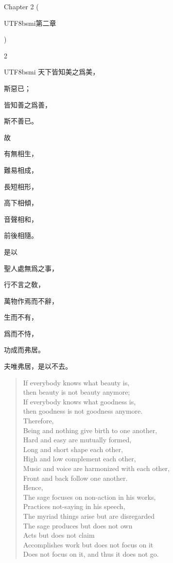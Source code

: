 Chapter 2 (\begin{CJK*}{UTF8}{bsmi}第二章\end{CJK*})
\begin{paracol}{2}
\begin{CJK*}{UTF8}{bsmi}
天下皆知美之爲美，

斯惡已；

皆知善之爲善，

斯不善已。

故

有無相生，

難易相成，

長短相形，

高下相傾，

音聲相和，

前後相隨。

是以

聖人處無爲之事，

行不言之敎，

萬物作焉而不辭，

生而不有，

爲而不恃，

功成而弗居。

夫唯弗居，是以不去。
\end{CJK*}
\switchcolumn
\vspace*{-2ex}
\begin{verse}
If everybody knows what beauty is,\\
then beauty is not beauty anymore;\\
If everybody knows what goodness is,\\
then goodness is not goodness anymore.\\
Therefore,\\
Being and nothing give birth to one another,\\
Hard and easy are mutually formed,\\
Long and short shape each other,\\
High and low complement each other,\\
Music and voice are harmonized with each other,\\
Front and back follow one another.\\
Hence,\\
The sage focuses on non-action in his works,\\
Practices not-saying in his speech,\\
The myriad things arise but are disregarded\\
The sage produces but does not own\\
Acts but does not claim\\
Accomplishes work but does not focus on it\\
Does not focus on it, and thus it does not go.
\end{verse}
\end{paracol}

